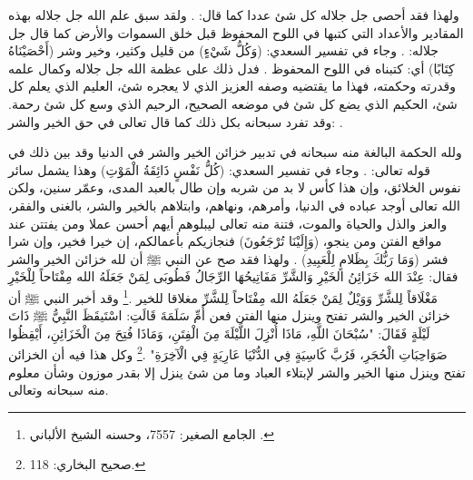 ولهذا فقد أحصى جل جلاله كل شئ عددا كما قال:
\quranayah*[72][28][10]{\footnotesize \surahname*[72]}. ولقد سبق علم الله جل جلاله بهذه المقادير والأعداد التي كتبها في اللوح المحفوظ قبل خلق السموات والأرض كما قال جل جلاله: \quranayah*[78][29]{\footnotesize \surahname*[78]}. وجاء في تفسير السعدي: (وَكُلُّ شَيْءٍ) من قليل وكثير، وخير وشر (أَحْصَيْنَاهُ كِتَابًا) أي: كتبناه في اللوح المحفوظ \href{https://shamela.ws/book/42/2064#p9}{\faExternalLink} \cite{tafsir_Saadi}. فدل ذلك على عظمة الله جل جلاله وكمال علمه وقدرته وحكمته، فهذا ما يقتضيه وصفه العزيز الذي لا يعجره شئ، العليم الذي يعلم كل شئ، الحكيم الذي يضع كل شئ في موضعه الصحيح، الرحيم الذي وسع كل شئ رحمة. وقد تفرد سبحانه بكل ذلك كما قال تعالى في حق الخير والشر: 
\quranayah*[10][107]{\footnotesize \surahname*[10]}.

ولله الحكمة البالغة منه سبحانه في تدبير خزائن الخير والشر في الدنيا وقد بين ذلك  في قوله تعالى: \quranayah*[21][35]{\footnotesize \surahname*[21]}. وجاء في تفسير السعدي:  (كُلُّ نَفْسٍ ذَائِقَةُ الْمَوْتِ) وهذا يشمل سائر نفوس الخلائق، وإن هذا كأس لا بد من شربه وإن طال بالعبد المدى، وعمّر سنين، ولكن الله تعالى أوجد عباده في الدنيا، وأمرهم، ونهاهم، وابتلاهم بالخير والشر، بالغنى والفقر، والعز والذل والحياة والموت، فتنة منه تعالى ليبلوهم أيهم أحسن عملا ومن يفتتن عند مواقع الفتن ومن ينجو، (وَإِلَيْنَا تُرْجَعُونَ) فنجازيكم بأعمالكم، إن خيرا فخير، وإن شرا فشر (وَمَا رَبُّكَ بِظَلامٍ لِلْعَبِيدِ) \href{https://shamela.ws/book/42/1178#p3}{\faExternalLink} \cite{tafsir_Saadi}. ولهذا فقد صح عن النبي ﷺ أن لله خزائن الخير والشر فقال: عِنْدَ الله خَزَائِنُ الخَيْرِ وَالشَّرِّ مَفَاتِيحُهَا الرِّجَالُ فَطُوبَى لِمَنْ جَعَلَهُ الله مِفْتَاحاً لِلْخَيْرِ مَغْلَاقاً لِلشَّرِّ وَوَيْلٌ لِمَنْ جَعَلَهُ الله مِفْتَاحاً لِلشَّرِّ مغلاقا للخير \href{https://shamela.ws/book/21659/7557#p1}{\faExternalLink} \cite{jamaaSagheer}.\footnote{الجامع الصغير: 7557، وحسنه الشيخ الألباني .} وقد أخبر النبي ﷺ أن خزائن الخير والشر تفتح وينزل منها الفتن فعن أُمِّ سَلَمَةَ قَالَتِ: اسْتَيقَظَ النَّبِيُّ ﷺ ذَاتَ لَيْلَةٍ فَقَالَ: "سُبْحَانَ اللَّهِ، مَاذَا أُنْزِلَ اللَّيْلَةَ مِنَ الْفِتَنِ، وَمَاذَا فُتِحَ مِنَ الْخَزَائِنِ، أَيْقِظُوا صَوَاحِبَاتِ الْحُجَرِ، فَرُبَّ كَاسِيَةٍ فِي الدُّنْيَا عَارِيَةٍ فِي الْآخِرَةِ" \href{https://shamela.ws/book/1284/251#p1}{\faExternalLink} \cite{bukhari}.\footnote{صحيح البخاري: 118.} وكل هذا فيه أن الخزائن تفتح وينزل منها الخير والشر لإبتلاء العباد وما من شئ ينزل إلا بقدر موزون وشأن معلوم منه سبحانه وتعالى.

